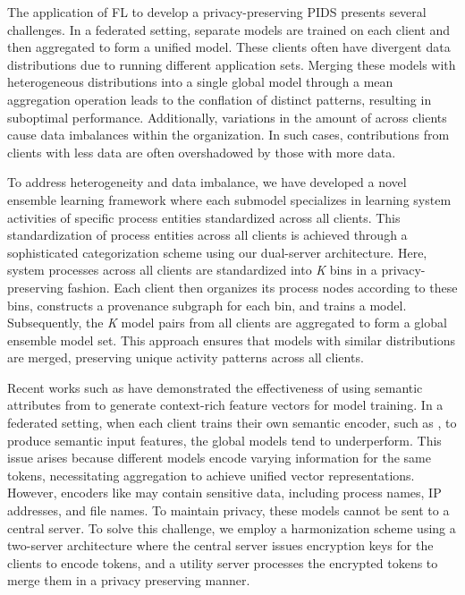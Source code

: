 The application of FL to develop a privacy-preserving PIDS presents several challenges. In a federated setting, separate models are trained on each client and then aggregated to form a unified model. These clients often have divergent data distributions due to running different application sets. Merging these models with heterogeneous distributions into a single global model through a mean aggregation operation leads to the conflation of distinct patterns, resulting in suboptimal performance. Additionally, variations in the amount of \logs across clients cause data imbalances within the organization. In such cases, contributions from clients with less data are often overshadowed by those with more data.

To address heterogeneity and data imbalance, we have developed a novel \gnnshort ensemble learning framework where each submodel specializes in learning system activities of specific process entities standardized across all clients. This standardization of process entities across all clients is achieved through a sophisticated categorization scheme using our dual-server architecture. Here, system processes across all clients are standardized into \textit{K} bins in a privacy-preserving fashion. Each client then organizes its process nodes according to these bins, constructs a provenance subgraph for each bin, and trains a \gnnshort model. Subsequently, the \textit{K} model pairs from all clients are aggregated to form a global ensemble model set. This approach ensures that models with similar distributions are merged, preserving unique activity patterns across all clients.


Recent works such as \flash have demonstrated the effectiveness of using semantic attributes from \logs to generate context-rich feature vectors for model training. In a federated setting, when each client trains their own semantic encoder, such as \wordvec, to produce semantic input features, the global \gnnshort models tend to underperform. This issue arises because different models encode varying information for the same tokens, necessitating aggregation to achieve unified vector representations. However, encoders like \wordvec may contain sensitive data, including process names, IP addresses, and file names. To maintain privacy, these models cannot be sent to a central server. To solve this challenge, we employ a \wordvec harmonization scheme using a two-server architecture where the central server issues encryption keys for the clients to encode \wordvec tokens, and a utility server processes the encrypted tokens to merge them in a privacy preserving manner.

